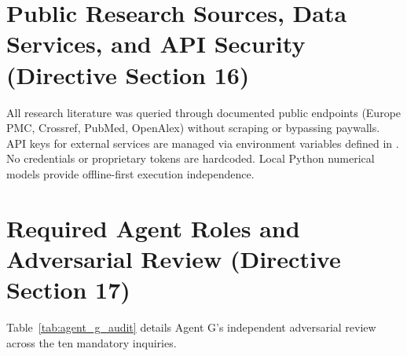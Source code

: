 \documentclass[10pt,a4paper]{article}
\begin{document}
\section{Public Research Sources, Data Services, and API Security (Directive Section 16)}
All research literature was queried through documented public endpoints (Europe PMC, Crossref, PubMed, OpenAlex) without scraping or bypassing paywalls. API keys for external services are managed via environment variables defined in . No credentials or proprietary tokens are hardcoded. Local Python numerical models provide offline-first execution independence.

\section{Required Agent Roles and Adversarial Review (Directive Section 17)}
Table~\ref{tab:agent_g_audit} details Agent G's independent adversarial review across the ten mandatory inquiries.
\end{document}
